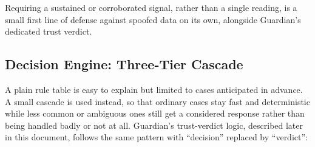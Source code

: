 \documentclass[10pt,letterpaper]{article}
\begin{document}
Requiring a sustained or corroborated signal, rather than a single reading, is a small first line of defense against spoofed data on its own, alongside Guardian's dedicated trust verdict.

\subsection{Decision Engine: Three-Tier Cascade}

A plain rule table is easy to explain but limited to cases anticipated in advance. A small cascade is used instead, so that ordinary cases stay fast and deterministic while less common or ambiguous ones still get a considered response rather than being handled badly or not at all. Guardian's trust-verdict logic, described later in this document, follows the same pattern with ``decision'' replaced by ``verdict'':
\end{document}
